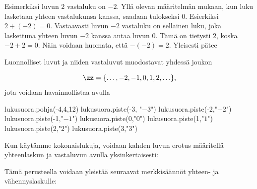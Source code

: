 
Esimerkiksi luvun $2$ vastaluku on $-2$. Yllä olevan määritelmän mukaan, kun luku lasketaan yhteen vastalukunsa kanssa, saadaan tulokseksi $0$.
Esierkiksi $2+(-2)=0$. Vastaavasti luvun $-2$ vastaluku on sellainen luku, joka laskettuna yhteen luvun $-2$ kanssa antaa luvun $0$.
Tämä on tietysti $2$, koska $-2+2=0$. Näin voidaan huomata, että $-(-2)=2$. Yleisesti pätee


Luonnolliset luvut ja niiden vastaluvut muodostavat yhdessä  joukon

\[\zz = \{\ldots, -2, -1, 0, 1, 2, \ldots\},\] jota voidaan havainnollistaa  avulla

\begin{kuva}
	lukusuora.pohja(-4,4,12)
	lukusuora.piste(-3, "$-3$")
	lukusuora.piste(-2,"$-2$")
	lukusuora.piste(-1,"$-1$")
	lukusuora.piste(0,"$0$")
	lukusuora.piste(1,"$1$")
	lukusuora.piste(2,"$2$")
	lukusuora.piste(3,"$3$")
\end{kuva}

%

Kun käytämme kokonaislukuja, voidaan kahden luvun erotus määritellä
yhteenlaskun ja vastaluvun avulla yksinkertaisesti:

\laatikko{
\[m-n = m+(-n)\]
}

Tämä perusteella voidaan yleistää seuraavat merkkisäännöt yhteen- ja vähennyslaskulle:



